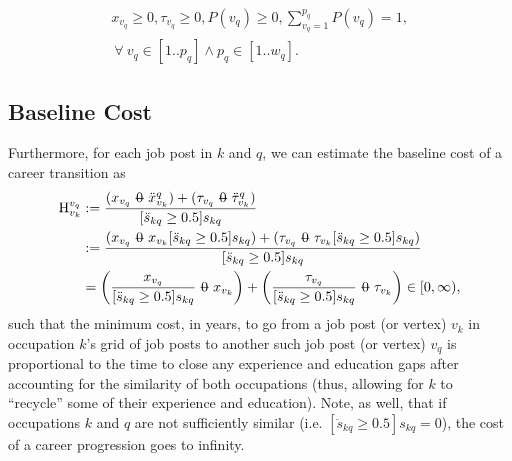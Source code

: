 \documentclass[12pt, a4paper]{article}
\makeatletter
\newcommand{\superimpose}[2]{{
  \ooalign{
    \hfil$\m@th#1\@firstoftwo#2$\hfil\cr
    \hfil$\m@th#1\@secondoftwo#2$\hfil\cr
  }
}}
\newcommand{\stack}[2]{\mathbin{\mathpalette\superimpose{{#1}{#2}}}}
\newcommand{\minuszero}{\stack{0}{-}}
\newcommand{\Eta}{\text{H}}
\makeatother
\begin{document}
\begin{gather}
  x_{v_q} \geq 0
  ,
  \tau_{v_q} \geq 0
  ,
  P(v_q) \geq 0
  ,
  \sum_{v_q=1}^{p_q} P(v_q) = 1
  , \\
  \
  \forall
  \
  v_q \in [1..p_q] \land p_q \in [1..w_q]
  .
\end{gather}

\subsection{Baseline Cost}
Furthermore, for each job post in $k$ and $q$, we can estimate the baseline
cost of a career transition as
\begin{align}
  \Eta_{v_k}^{v_q}
   & :=
  \frac{
    (x_{v_q} \minuszero \ddot{x}_{v_k}^{q})
    +
    (\tau_{v_q} \minuszero \ddot{\tau}_{v_k}^{q})
  }{
    [\ddot{s}_{kq} \geq 0.5] s_{kq}
  }
  \\
   & :=
  \frac{
    (x_{v_q} \minuszero x_{v_k} [\ddot{s}_{kq} \geq 0.5] s_{kq})
    +
    (\tau_{v_q} \minuszero \tau_{v_k} [\ddot{s}_{kq} \geq 0.5] s_{kq})
  }{
    [\ddot{s}_{kq} \geq 0.5] s_{kq}
  }
  \\
   & =
  \left(
  \frac{x_{v_q}}{[\ddot{s}_{kq} \geq 0.5] s_{kq}}
  \minuszero
  x_{v_k}
  \right)
  +
  \left(
  \frac{\tau_{v_q}}{[\ddot{s}_{kq} \geq 0.5] s_{kq}}
  \minuszero
  \tau_{v_k}
  \right)
  \in
  [0, \infty)
  ,
\end{align}
such that the minimum cost, in years, to go from a job post (or vertex) $v_k$
in occupation $k$'s grid of job posts to another such job post (or vertex) $v_q$
is proportional to the time to close any experience and education gaps after accounting for the similarity of both occupations (thus, allowing for $k$ to ``recycle'' some of their experience and education). Note, as well, that if occupations $k$ and $q$ are not sufficiently similar (i.e. $[\ddot{s}_{kq} \geq 0.5] s_{kq} = 0$), the cost of a career progression goes to infinity.
\end{document}
